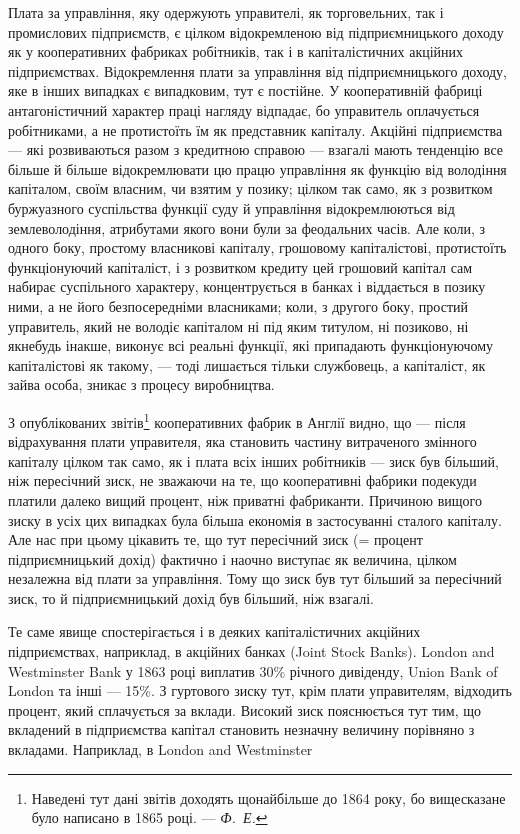 
Плата за управління, яку одержують управителі, як торговельних,
так і промислових підприємств, є цілком відокремленою від
підприємницького доходу як у кооперативних фабриках робітників,
так і в капіталістичних акційних підприємствах. Відокремлення
плати за управління від підприємницького доходу, яке в інших
випадках є випадковим, тут є постійне. У кооперативній фабриці
антагоністичний характер праці нагляду відпадає, бо управитель
оплачується робітниками, а не протистоїть їм як представник
капіталу. Акційні підприємства — які розвиваються разом
з кредитною справою — взагалі мають тенденцію все більше й
більше відокремлювати цю працю управління як функцію від
володіння капіталом, своїм власним, чи взятим у позику; цілком
так само, як з розвитком буржуазного суспільства функції суду
й управління відокремлюються від землеволодіння, атрибутами
якого вони були за феодальних часів. Але коли, з одного
боку, простому власникові капіталу, грошовому капіталістові,
протистоїть функціонуючий капіталіст, і з розвитком кредиту
цей грошовий капітал сам набирає суспільного характеру, концентрується
в банках і віддається в позику ними, а не його безпосередніми
власниками; коли, з другого боку, простий
управитель, який не володіє капіталом ні під яким титулом,
ні позиково, ні якнебудь інакше, виконує всі реальні функції,
які припадають функціонуючому капіталістові як такому, — тоді
лишається тільки службовець, а капіталіст, як зайва особа,
зникає з процесу виробництва.

З опублікованих звітів\footnote{
Наведені тут дані звітів доходять щонайбільше до 1864 року, бо вищесказане
було написано в 1865 році. — \emph{Ф.~Е.}
} кооперативних фабрик в Англії видно,
що — після відрахування плати управителя, яка становить частину
витраченого змінного капіталу цілком так само, як і плата
всіх інших робітників — зиск був більший, ніж пересічний зиск,
не зважаючи на те, що кооперативні фабрики подекуди платили
далеко вищий процент, ніж приватні фабриканти. Причиною
вищого зиску в усіх цих випадках була більша економія
в застосуванні сталого капіталу. Але нас при цьому цікавить те,
що тут пересічний зиск (= процент \dplus{} підприємницький дохід)
фактично і наочно виступає як величина, цілком незалежна від
плати за управління. Тому що зиск був тут більший за пересічний
зиск, то й підприємницький дохід був більший, ніж взагалі.

Те саме явище спостерігається і в деяких капіталістичних акційних
підприємствах, наприклад, в акційних банках (Joint Stock
Banks). London and Westminster Bank у 1863 році виплатив 30\%
річного дивіденду, Union Bank of London та інші — 15\%. З гуртового
зиску тут, крім плати управителям, відходить процент,
який сплачується за вклади. Високий зиск пояснюється тут тим,
що вкладений в підприємства капітал становить незначну величину
порівняно з вкладами. Наприклад, в London and Westminster
\parbreak{}  %

